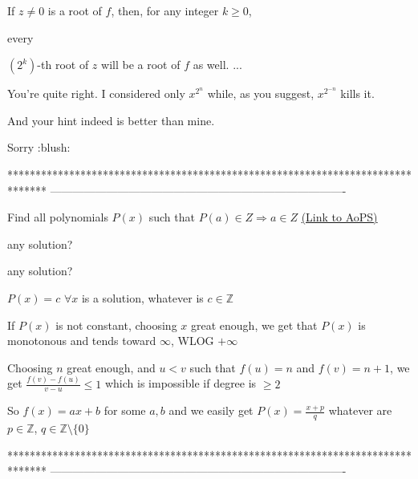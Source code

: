 \begin{solution}
	\begin{tcolorbox}If $z \neq 0$ is a root of $f$, then, for any integer $k \geq 0$, \begin{bolded}every\end{bolded} $\left(2^k\right)$-th root of $z$ will be a root of $f$ as well.  ...\end{tcolorbox}
You're quite right. I considered only $x^{2^n}$ while, as you suggest, $x^{2^{-n}}$ kills it.

And your hint indeed is better than mine.

Sorry :blush:
\end{solution}
*******************************************************************************
-------------------------------------------------------------------------------

\begin{problem}
	Find all polynomials $P(x)$ such that $P(a)\in Z\Rightarrow a\in Z$
	\flushright \href{https://artofproblemsolving.com/community/c6h578390}{(Link to AoPS)}
\end{problem}



\begin{solution}
	any solution?
\end{solution}



\begin{solution}
	\begin{tcolorbox}any solution?\end{tcolorbox}
$\boxed{P(x)=c}$ $\forall x$ is a solution, whatever is $c\in\mathbb Z$

If $P(x)$ is not constant, choosing $x$ great enough, we get that $P(x)$ is monotonous and tends toward $\infty$, WLOG $+\infty$

Choosing $n$ great enough, and $u<v$ such that $f(u)=n$ and $f(v)=n+1$, we get $\frac{f(v)-f(u)}{v-u}\le 1$ which is impossible if degree is $\ge 2$

So $f(x)=ax+b$ for some $a,b$ and we easily get $\boxed{P(x)=\frac{x+p}q}$ whatever are $p\in\mathbb Z$, $q\in\mathbb Z\setminus\{0\}$
\end{solution}
*******************************************************************************
-------------------------------------------------------------------------------

